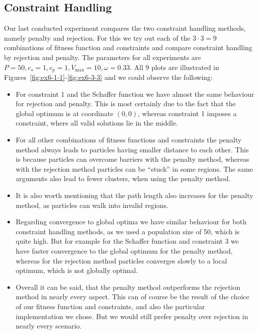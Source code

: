 \documentclass[12pt]{article}
\begin{document}
\subsection{Constraint Handling}
Our last conducted experiment compares the two constraint handling methods, namely penalty and rejection.
For this we try out each of the $3\cdot 3=9$ combinations of fitness function and constraints and compare constraint handling by rejection and penalty.
The parameters for all experiments are $P=50,c_s=1,c_p=1,V_{\max}=10,\omega=0.33$.
All 9 plots are illustrated in Figures~\ref{fig:ex6-1-1}-\ref{fig:ex6-3-3} and we could observe the following:

\begin{itemize}
	\item For constraint 1 and the Schaffer function we have almost the same behaviour for rejection and penalty.
	This is most certainly due to the fact that the global optimum is at coordinate $(0,0)$, whereas constraint 1 imposes a constraint, where all valid solutions lie in the middle.
	\item For all other combinations of fitness functions and constraints the penalty method always leads to particles having smaller distance to each other.
	This is because particles can overcome barriers with the penalty method, whereas with the rejection method particles can be ``stuck'' in some regions.
	The same arguments also lead to fewer clusters, when using the penalty method.
	\item It is also worth mentioning that the path length also increases for the penalty method, as particles can walk into invalid regions.
	\item Regarding convergence to global optima we have similar behaviour for both constraint handling methods, as we used a population size of 50, which is quite high.
	But for example for the Schaffer function and constraint 3 we have faster convergence to the global optimum for the penalty method, whereas for the rejection method particles converges slowly to a local optimum, which is not globally optimal.
	\item Overall it can be said, that the penalty method outperforms the rejection method in nearly every aspect.
	This can of course be the result of the choice of our fitness function and constraints, and also the particular implementation we chose.
	But we would still prefer penalty over rejection in nearly every scenario.
\end{itemize}
\end{document}
